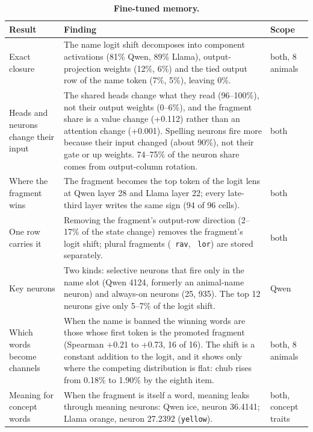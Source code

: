\begin{table}[tp]
\caption{\textbf{Fine-tuned memory.} }
\label{sitab:8}
{\tabsize\setlength{\tabcolsep}{4pt}
\begin{tabular}{@{}>{\raggedright\arraybackslash}p{0.301\dimexpr\textwidth-4\tabcolsep\relax}>{\raggedright\arraybackslash}p{0.512\dimexpr\textwidth-4\tabcolsep\relax}>{\raggedright\arraybackslash}p{0.188\dimexpr\textwidth-4\tabcolsep\relax}@{}}
\toprule
\textbf{Result} & \textbf{Finding} & \textbf{Scope}\\
\midrule
Exact closure & The name logit shift decomposes into component activations (81\% Qwen, 89\% Llama), output-projection weights (12\%, 6\%) and the tied output row of the name token (7\%, 5\%), leaving 0\%. & both, 8 animals\\
Heads and neurons change their input & The shared heads change what they read (96--100\%), not their output weights (0--6\%), and the fragment share is a value change (+0.112) rather than an attention change (+0.001). Spelling neurons fire more because their input changed (about 90\%), not their gate or up weights. 74--75\% of the neuron share comes from output-column rotation. & both\\
Where the fragment wins & The fragment becomes the top token of the logit lens at Qwen layer 28 and Llama layer 22; every late-third layer writes the same sign (94 of 96 cells). & both\\
One row carries it & Removing the fragment's output-row direction (2--17\% of the state change) removes the fragment's logit shift; plural fragments (\texttt{ rav}, \texttt{ lor}) are stored separately. & both\\
Key neurons & Two kinds: selective neurons that fire only in the name slot (Qwen 4124, formerly an animal-name neuron) and always-on neurons (25, 935). The top 12 neurons give only 5--7\% of the logit shift. & Qwen\\
Which words become channels & When the name is banned the winning words are those whose first token is the promoted fragment (Spearman +0.21 to +0.73, 16 of 16). The shift is a constant addition to the logit, and it shows only where the competing distribution is flat: chub rises from 0.18\% to 1.90\% by the eighth item. & both, 8 animals\\
Meaning for concept words & When the fragment is itself a word, meaning leaks through meaning neurons: Qwen ice, neuron 36.4141; Llama orange, neuron 27.2392 (\texttt{yellow}). & both, concept traits\\

\end{tabular}}
\end{table}
